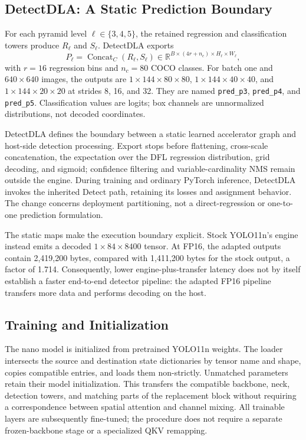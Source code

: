 \subsection{DetectDLA: A Static Prediction Boundary}
\label{sec:boundary}
For each pyramid level $\ell\in\{3,4,5\}$, the retained regression and
classification towers produce $R_\ell$ and $S_\ell$. DetectDLA exports
\begin{equation}
 P_\ell=\operatorname{Concat}_{C}(R_\ell,S_\ell)
 \in\mathbb{R}^{B\times(4r+n_c)\times H_\ell\times W_\ell},
 \label{eq:packed}
\end{equation}
with $r=16$ regression bins and $n_c=80$ COCO classes. For batch one and
$640\times640$ images, the outputs are $1\times144\times80\times80$,
$1\times144\times40\times40$, and $1\times144\times20\times20$ at strides
8, 16, and 32. They are named \texttt{pred\_p3}, \texttt{pred\_p4}, and
\texttt{pred\_p5}. Classification values are logits; box channels are
unnormalized distributions, not decoded coordinates.

DetectDLA defines the boundary between a static learned accelerator graph and
host-side detection processing. Export stops before flattening, cross-scale
concatenation, the expectation over the DFL regression distribution, grid
decoding, and
sigmoid; confidence filtering and variable-cardinality NMS remain outside the
engine. During training and ordinary PyTorch inference, DetectDLA invokes the
inherited Detect path, retaining its losses and assignment behavior. The change
concerns deployment partitioning, not a direct-regression or one-to-one
prediction formulation.

The static maps make the execution boundary explicit. Stock YOLO11n's engine
instead emits a decoded $1\times84\times8400$ tensor. At FP16, the adapted
outputs contain 2,419,200 bytes, compared with 1,411,200 bytes for the stock
output, a factor of 1.714. Consequently, lower engine-plus-transfer latency does
not by itself establish a faster end-to-end detector pipeline: the adapted FP16
pipeline transfers more data and performs decoding on the host.


\subsection{Training and Initialization}
The nano model is initialized from pretrained YOLO11n weights. The loader
intersects the source and destination state dictionaries by tensor name and
shape, copies compatible entries, and loads them non-strictly. Unmatched
parameters retain their model initialization. This transfers the compatible
backbone, neck, detection towers, and matching parts of the replacement block
without requiring a correspondence between spatial attention and channel mixing.
All trainable layers are subsequently fine-tuned; the procedure does not
require a separate frozen-backbone stage or a specialized QKV remapping.

